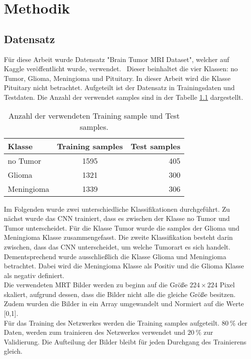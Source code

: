 \chapter{Methodik}

\section{Datensatz}
Für diese Arbeit wurde Datensatz "Brain Tumor MRI Dataset", welcher auf Kaggle veröffentlicht wurde, verwendet.~\cite{msoud_nickparvar_2021}
Dieser beinhaltet die vier Klassen: no Tumor, Glioma, Meningioma und Pituitary.
In dieser Arbeit wird die Klasse Pituitary nicht betrachtet.
Aufgeteilt ist der Datensatz in Trainingsdaten und Testdaten.
Die Anzahl der verwendet samples sind in der Tabelle \ref{tab:daten} dargestellt. 
\begin{table}[htbp]
    \centering
    \begin{tabular}{l c r}
        \hline
        Klasse      & Training samples & Test samples \\
        \hline
        no Tumor    &    1595          & 405 \\
        Glioma      &    1321          & 300 \\
        Meningioma  &    1339          & 306 \\
        \hline
  \end{tabular}
  \caption{Anzahl der verwendeten Training sample und Test samples.}
  \label{tab:daten}
\end{table}
Im Folgenden wurde zwei unterschiedliche Klassifikationen durchgeführt.
Zu nächst wurde das CNN trainiert, dass es zwischen der Klasse no Tumor und Tumor unterscheidet. Für die Klasse Tumor
wurde die samples der Glioma und Meningioma Klasse zusammengefasst.
Die zweite Klassifikation besteht darin zwischen, dass das CNN unterscheidet, um welche Tumorart es sich handelt.
Dementsprechend wurde ausschließlich die Klasse Glioma und Meningioma betrachtet.
Dabei wird die Meningioma Klasse als Positiv  und die Glioma Klasse als negativ definiert.\\


Die verwendeten MRT Bilder werden zu beginn auf die Größe $224 \times 224$ Pixel skaliert, aufgrund dessen, dass die Bilder nicht alle die 
gleiche Größe besitzen.
Zudem wurden die Bilder in ein Array umgewandelt und Normiert auf die Werte [0,1].\\

Für das Training des Netzwerkes werden die Training samples aufgeteilt. $\qty{80}{\%}$ der Daten, werden zum trainieren des Netzwerkes 
verwendet und $\qty{20}{\%}$ zur Validierung.
Die Aufteilung der Bilder bleibt für jeden Durchgang des Trainierens gleich.

